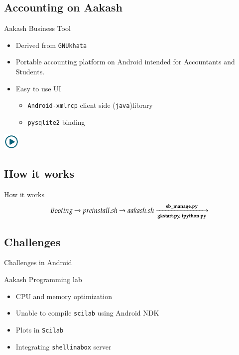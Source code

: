 \documentclass{beamer}
\begin{document}
  \subsection{Accounting on Aakash}
  \begin{frame}{Aakash Business Tool}
    \begin{itemize}
      \item Derived from {\tt GNUkhata}
      \item Portable accounting platform on Android intended for
        Accountants and Students.
      \item Easy to use UI
        \pause
        \begin{itemize}
          \item {\tt Android-xmlrcp} client side ({\tt java})library
          \item {\tt pysqlite2} binding
        \end{itemize}
    \end{itemize}
      \centerline{\href{file:///home/sachin/github/slides/techfest2013/abt.avi}{\includegraphics[height=0.8cm,width=0.8cm]{play.jpg}}}
  \end{frame}

  \subsection{How it works}
  \begin{frame}{How it works}
    \begin{equation*}
      Booting \xrightarrow[\text{}]{} 
      preinstall.sh \xrightarrow[\text{}]{}
      aakash.sh\xrightarrow[\text{\bf{gkstart.py, ipython.py}}]{\bf{sb\_manage.py}}
    \end{equation*}
  \end{frame}

  \subsection{Challenges}
  \begin{frame}{Challenges in Android}
    \begin{block}{Aakash Programming lab}
      \begin{itemize}
        \item CPU and memory optimization
        \item Unable to compile {\tt scilab} using Android NDK
        \item Plots in {\tt Scilab}
        \item Integrating {\tt shellinabox} server
      \end{itemize}
    \end{block}
    \end{frame}
\end{document}
